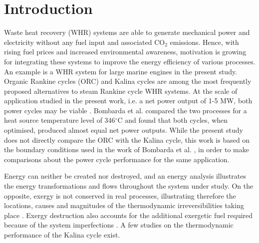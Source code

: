 \documentclass[final,times,5p]{elsarticle}
\begin{document}


\section{Introduction}
\label{sec:introduction}
	

\begin{table}[!ht]
  \begin{framed}
  \footnotesize
    \printnomenclature
  \end{framed}
\end{table}


Waste heat recovery (WHR) systems are able to generate mechanical power and electricity without any fuel input and associated CO$_2$ emissions. Hence, with rising fuel prices and increased environmental awareness, motivation is growing for integrating these systems to improve the energy efficiency of various processes. An example is a WHR system for large marine engines in the present study. Organic Rankine cycles (ORC) and Kalina cycles are among the most frequently proposed alternatives to steam Rankine cycle WHR systems. At the scale of application studied in the present work, i.e. a net power output of 1-5 MW, both power cycles may be viable \cite{Tchanche20113963,Jonsson2001c}. Bombarda et al. \cite{Bombarda2010b} compared the two processes for a heat source temperature level of 346$^\circ$C and found that both cycles, when optimised, produced almost equal net power outputs. While the present study does not directly compare the ORC with the Kalina cycle, this work is based on the boundary conditions used in the work of Bombarda et al. \cite{Bombarda2010b}, in order to make comparisons about the power cycle performance for the same application.

Energy can neither be created nor destroyed, and an energy analysis illustrates the energy transformations and flows throughout the system under study. On the opposite, exergy is not conserved in real processes, illustrating therefore the locations, causes and magnitudes of the thermodynamic irreversibilities taking place \cite{BejanAdrian;TsatsaronisGeorge;Moran1996,Bejan2006}. Exergy destruction also accounts for the additional exergetic fuel required because of the system imperfections \cite{Wall1988,Kotas1980,Kotas1980a,Kotas1995}. A few studies on the thermodynamic performance of the Kalina cycle exist. 
\end{document}
